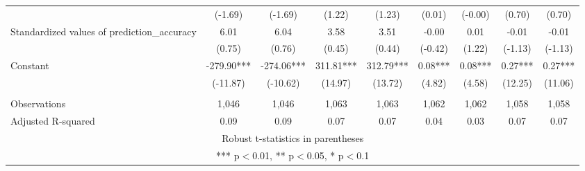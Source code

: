 \documentclass[]{article}
\begin{document}
\begin{tabular}{lcccccccc}
 & (-1.69) & (-1.69) & (1.22) & (1.23) & (0.01) & (-0.00) & (0.70) & (0.70) \\
Standardized values of prediction\_accuracy & 6.01 & 6.04 & 3.58 & 3.51 & -0.00 & 0.01 & -0.01 & -0.01 \\
 & (0.75) & (0.76) & (0.45) & (0.44) & (-0.42) & (1.22) & (-1.13) & (-1.13) \\
Constant & -279.90*** & -274.06*** & 311.81*** & 312.79*** & 0.08*** & 0.08*** & 0.27*** & 0.27*** \\
 & (-11.87) & (-10.62) & (14.97) & (13.72) & (4.82) & (4.58) & (12.25) & (11.06) \\
 &  &  &  &  &  &  &  &  \\
Observations & 1,046 & 1,046 & 1,063 & 1,063 & 1,062 & 1,062 & 1,058 & 1,058 \\
 Adjusted R-squared & 0.09 & 0.09 & 0.07 & 0.07 & 0.04 & 0.03 & 0.07 & 0.07 \\ \hline
\multicolumn{9}{c}{ Robust t-statistics in parentheses} \\
\multicolumn{9}{c}{ *** p$<$0.01, ** p$<$0.05, * p$<$0.1} \\
\end{tabular}
\end{document}
